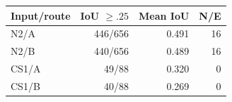 \begin{tabular}{lrrr}
\toprule
Input/route & IoU $\geq .25$ & Mean IoU & N/E \\
\midrule
N2/A & 446/656 & 0.491 & 16 \\
N2/B & 440/656 & 0.489 & 16 \\
CS1/A & 49/88 & 0.320 & 0 \\
CS1/B & 40/88 & 0.269 & 0 \\
\bottomrule
\end{tabular}

